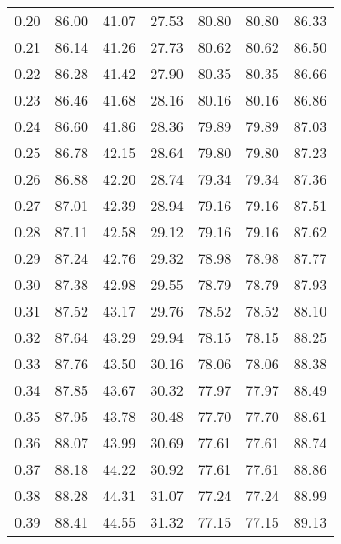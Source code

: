 \begin{tabular}{|c|c|c|c|c|c|c|}
      0.20 &     86.00 &     41.07 &      27.53 &   80.80 &      80.80 &         86.33 \\
      0.21 &     86.14 &     41.26 &      27.73 &   80.62 &      80.62 &         86.50 \\
      0.22 &     86.28 &     41.42 &      27.90 &   80.35 &      80.35 &         86.66 \\
      0.23 &     86.46 &     41.68 &      28.16 &   80.16 &      80.16 &         86.86 \\
      0.24 &     86.60 &     41.86 &      28.36 &   79.89 &      79.89 &         87.03 \\
      0.25 &     86.78 &     42.15 &      28.64 &   79.80 &      79.80 &         87.23 \\
      0.26 &     86.88 &     42.20 &      28.74 &   79.34 &      79.34 &         87.36 \\
      0.27 &     87.01 &     42.39 &      28.94 &   79.16 &      79.16 &         87.51 \\
      0.28 &     87.11 &     42.58 &      29.12 &   79.16 &      79.16 &         87.62 \\
      0.29 &     87.24 &     42.76 &      29.32 &   78.98 &      78.98 &         87.77 \\
      0.30 &     87.38 &     42.98 &      29.55 &   78.79 &      78.79 &         87.93 \\
      0.31 &     87.52 &     43.17 &      29.76 &   78.52 &      78.52 &         88.10 \\
      0.32 &     87.64 &     43.29 &      29.94 &   78.15 &      78.15 &         88.25 \\
      0.33 &     87.76 &     43.50 &      30.16 &   78.06 &      78.06 &         88.38 \\
      0.34 &     87.85 &     43.67 &      30.32 &   77.97 &      77.97 &         88.49 \\
      0.35 &     87.95 &     43.78 &      30.48 &   77.70 &      77.70 &         88.61 \\
      0.36 &     88.07 &     43.99 &      30.69 &   77.61 &      77.61 &         88.74 \\
      0.37 &     88.18 &     44.22 &      30.92 &   77.61 &      77.61 &         88.86 \\
      0.38 &     88.28 &     44.31 &      31.07 &   77.24 &      77.24 &         88.99 \\
      0.39 &     88.41 &     44.55 &      31.32 &   77.15 &      77.15 &         89.13 \\

\end{tabular}
